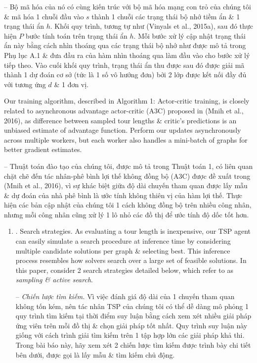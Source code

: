\documentclass{article}
\begin{document}
\begin{itemize}
    -- Bộ mã hóa của nó có cùng kiến trúc với bộ mã hóa mạng con trỏ của chúng tôi \& mã hóa 1 chuỗi đầu vào $s$ thành 1 chuỗi các trạng thái bộ nhớ tiềm ẩn \& 1 trạng thái ẩn $h$. Khối quy trình, tương tự như (Vinyals et al., 2015a), sau đó thực hiện $P$ bước tính toán trên trạng thái ẩn $h$. Mỗi bước xử lý cập nhật trạng thái ẩn này bằng cách nhìn thoáng qua các trạng thái bộ nhớ như được mô tả trong Phụ lục A.1 \& đưa đầu ra của hàm nhìn thoáng qua làm đầu vào cho bước xử lý tiếp theo. Vào cuối khối quy trình, trạng thái ẩn thu được sau đó được giải mã thành 1 dự đoán cơ sở (tức là 1 số vô hướng đơn) bởi 2 lớp được kết nối đầy đủ với tương ứng $d$ \& 1 đơn vị.
    
    Our training algorithm, described in {\sf Algorithm 1: Actor-critic training}, is closely related to asynchronous advantage actor-critic (A3C) proposed in (Mnih et al., 2016), as difference between sampled tour lengths \& critic's predictions is an unbiased estimate of advantage function. Perform our updates asynchronously across multiple workers, but each worker also handles a mini-batch of graphs for better gradient estimates.
    
    -- Thuật toán đào tạo của chúng tôi, được mô tả trong Thuật toán 1, có liên quan chặt chẽ đến tác nhân-phê bình lợi thế không đồng bộ (A3C) được đề xuất trong (Mnih et al., 2016), vì sự khác biệt giữa độ dài chuyến tham quan được lấy mẫu \& dự đoán của nhà phê bình là ước tính không thiên vị của hàm lợi thế. Thực hiện các bản cập nhật của chúng tôi 1 cách không đồng bộ trên nhiều công nhân, nhưng mỗi công nhân cũng xử lý 1 lô nhỏ các đồ thị để ước tính độ dốc tốt hơn.
    \begin{enumerate}
        \item {. Search strategies.} As evaluating a tour length is inexpensive, our TSP agent can easily simulate a search procedure at inference time by considering multiple candidate solutions per graph \& selecting best. This inference process resembles how solvers search over a large set of feasible solutions. In this paper, consider 2 search strategies detailed below, which refer to as {\it sampling \& active search}.
        
        -- {\it Chiến lược tìm kiếm.} Vì việc đánh giá độ dài của 1 chuyến tham quan không tốn kém, nên tác nhân TSP của chúng tôi có thể dễ dàng mô phỏng 1 quy trình tìm kiếm tại thời điểm suy luận bằng cách xem xét nhiều giải pháp ứng viên trên mỗi đồ thị \& chọn giải pháp tốt nhất. Quy trình suy luận này giống với cách trình giải tìm kiếm trên 1 tập hợp lớn các giải pháp khả thi. Trong bài báo này, hãy xem xét 2 chiến lược tìm kiếm được trình bày chi tiết bên dưới, được gọi là lấy mẫu \& tìm kiếm chủ động.
        

\end{enumerate}
\end{itemize}
\end{document}
